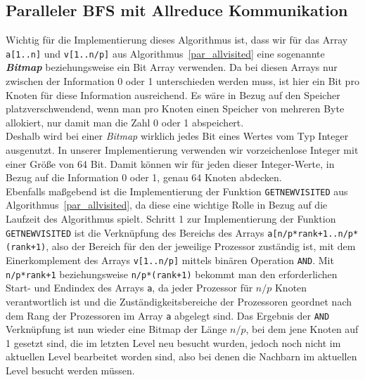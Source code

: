 \documentclass[11pt,a4paper]{article}
\begin{document}
\subsection{Paralleler BFS mit Allreduce Kommunikation}
\label{sec:allreduce_details}
Wichtig für die Implementierung dieses Algorithmus ist, dass wir für das Array \lstinline{a[1..n]} und \lstinline{v[1..n/p]} aus Algorithmus~\ref{par_allvisited} eine sogenannte \textbf{\textit{Bitmap}} beziehungsweise ein Bit Array verwenden. Da bei diesen Arrays nur zwischen der Information 0 oder 1 unterschieden werden muss, ist hier ein Bit pro Knoten für diese Information ausreichend. Es wäre in Bezug auf den Speicher platzverschwendend, wenn man pro Knoten einen Speicher von mehreren Byte allokiert, nur damit man die Zahl 0 oder 1 abspeichert.\\
Deshalb wird bei einer \textit{Bitmap} wirklich jedes Bit eines Wertes vom Typ Integer ausgenutzt. In unserer Implementierung verwenden wir vorzeichenlose Integer mit einer Größe von 64 Bit. Damit können wir für jeden dieser Integer-Werte, in Bezug auf die Information 0 oder 1, genau 64 Knoten abdecken.\\
Ebenfalls maßgebend ist die Implementierung der Funktion \lstinline{GETNEWVISITED} aus Algorithmus~\ref{par_allvisited}, da diese eine wichtige Rolle in Bezug auf die Laufzeit des Algorithmus spielt. Schritt 1 zur Implementierung der Funktion \lstinline{GETNEWVISITED} ist die Verknüpfung des Bereichs des Arrays \lstinline{a[n/p*rank+1..n/p*(rank+1)}, also der Bereich für den der jeweilige Prozessor zuständig ist, mit dem Einerkomplement des Arrays \lstinline{v[1..n/p]} mittels binären Operation \lstinline{AND}. Mit \lstinline{n/p*rank+1} beziehungsweise \lstinline{n/p*(rank+1)} bekommt man den erforderlichen Start- und Endindex des Arrays \lstinline{a}, da jeder Prozessor für \(n/p\) Knoten verantwortlich ist und die Zuständigkeitsbereiche der Prozessoren geordnet nach dem Rang der Prozessoren im Array \lstinline{a} abgelegt sind. Das Ergebnis der \lstinline{AND} Verknüpfung ist nun wieder eine Bitmap der Länge \(n/p\), bei dem jene Knoten auf 1 gesetzt sind, die im letzten Level neu besucht wurden, jedoch noch nicht im aktuellen Level bearbeitet worden sind, also bei denen die Nachbarn im aktuellen Level besucht werden müssen. 
\end{document}
